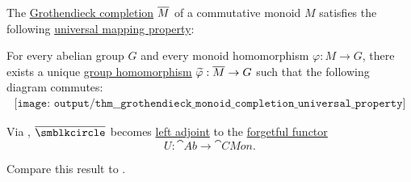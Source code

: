\begin{theorem}\label{thm:grothendieck_monoid_completion_universal_property}
  The \hyperref[def:monoid_grothendieck_completion]{Grothendieck completion} \( \oline{M} \) of a commutative monoid \( M \) satisfies the following \hyperref[rem:universal_mapping_property]{universal mapping property}:
  \begin{displayquote}
    For every abelian group \( G \) and every monoid homomorphism \( \varphi: M \to G \), there exists a unique \hyperref[def:group/homomorphism]{group homomorphism} \( \widetilde{\varphi}: \oline{M} \to G \) such that the following diagram commutes:
    \begin{equation}\label{eq:thm:grothendieck_monoid_completion_universal_property/diagram}
      \begin{aligned}
        \texttt{[image: output/thm\_\_grothendieck\_monoid\_completion\_universal\_property]}
      \end{aligned}
    \end{equation}
  \end{displayquote}
\end{theorem}
\begin{comments}
  \item Via , \( \oline{\anon} \) becomes \hyperref[def:category_adjunction]{left adjoint} to the \hyperref[def:concrete_category]{forgetful functor}
  \begin{equation*}
    U: \cat{Ab} \to \cat{CMon}.
  \end{equation*}

  \item Compare this result to .
\end{comments}
